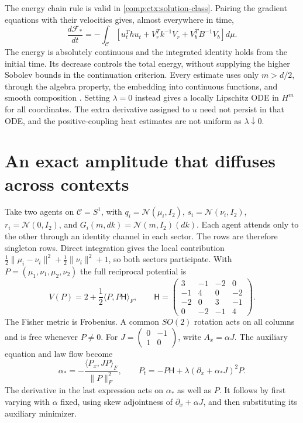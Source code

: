 The energy chain rule is valid in \cref{comp:ctx:solution-class}. Pairing the gradient equations with their velocities gives, almost everywhere in time,
\begin{equation}
 \frac{d\mathcal F_*}{dt}
 =-\int_{\mathcal C}
 \left[u_t^Thu_t+V_r^Tk^{-1}V_r+V_b^TB^{-1}V_b\right]d\mu.
 \label{comp:ctx:continuum-dissipation}
\end{equation}
The energy is absolutely continuous and the integrated identity holds from the initial time. Its decrease controls the total energy, without supplying the higher Sobolev bounds in the continuation criterion. Every estimate uses only $m>d/2$, through the algebra property, the embedding into continuous functions, and smooth composition \citep{Taylor2011}. Setting $\lambda=0$ instead gives a locally Lipschitz ODE in $H^m$ for all coordinates. The extra derivative assigned to $u$ need not persist in that ODE, and the positive-coupling heat estimates are not uniform as $\lambda\downarrow0$.

\section{An exact amplitude that diffuses across contexts}

Take two agents on $\mathcal C=S^1$, with $q_i=\mathcal N(\mu_i,I_2)$, $s_i=\mathcal N(\nu_i,I_2)$, $r_i=\mathcal N(0,I_2)$, and $G_i(m,dk)=\mathcal N(m,I_2)(dk)$. Each agent attends only to the other through an identity channel in each sector. The rows are therefore singleton rows. Direct integration gives the local contribution $\frac12\|\mu_i-\nu_i\|^2+\frac12\|\nu_i\|^2+1$, so both sectors participate. With $P=(\mu_1,\nu_1,\mu_2,\nu_2)$ the full reciprocal potential is
\begin{equation}
 V(P)=2+\frac12\langle P,P\mathsf H\rangle_F,\qquad
 \mathsf H=\begin{pmatrix}
 3&-1&-2&0\\-1&4&0&-2\\-2&0&3&-1\\0&-2&-1&4
 \end{pmatrix}.
 \label{comp:ctx:gaussian-potential}
\end{equation}
The Fisher metric is Frobenius. A common $SO(2)$ rotation acts on all columns and is free whenever $P\ne0$. For $J=\left(\begin{smallmatrix}0&-1\\1&0\end{smallmatrix}\right)$, write $A_x=\alpha J$. The auxiliary equation and law flow become
\begin{equation}
 \alpha_*=-\frac{\langle P_x,JP\rangle_F}{\|P\|_F^2},\qquad
 P_t=-P\mathsf H+\lambda(\partial_x+\alpha_*J)^2P.
 \label{comp:ctx:matrix-flow}
\end{equation}
The derivative in the last expression acts on $\alpha_*$ as well as $P$. It follows by first varying with $\alpha$ fixed, using skew adjointness of $\partial_x+\alpha J$, and then substituting its auxiliary minimizer.


